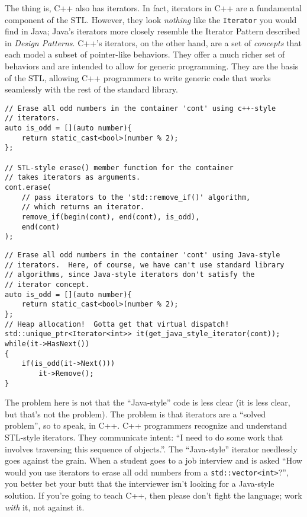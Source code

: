 \documentclass{article}
\begin{document}
The thing is, C++ also has iterators.  In fact, iterators in C++ are a fundamental component of the STL.  However, they look \emph{nothing} like the \lstinline{Iterator} you would find in Java; Java's iterators more closely resemble the Iterator Pattern described in \textit{Design Patterns}.  C++'s iterators, on the other hand, are a set of \emph{concepts} that each model a subset of pointer-like behaviors.  They offer a much richer set of behaviors and are intended to allow for generic programming.  They are the basis of the STL, allowing C++ programmers to write generic code that works seamlessly with the rest of the standard library.

\begin{lstlisting}
// Erase all odd numbers in the container 'cont' using c++-style 
// iterators.
auto is_odd = [](auto number){
	return static_cast<bool>(number % 2);
};

// STL-style erase() member function for the container 
// takes iterators as arguments.
cont.erase(
	// pass iterators to the 'std::remove_if()' algorithm, 
	// which returns an iterator.
	remove_if(begin(cont), end(cont), is_odd), 
	end(cont)
);
\end{lstlisting}

\begin{lstlisting}
// Erase all odd numbers in the container 'cont' using Java-style
// iterators.  Here, of course, we have can't use standard library
// algorithms, since Java-style iterators don't satisfy the 
// iterator concept.
auto is_odd = [](auto number){
	return static_cast<bool>(number % 2);
};
// Heap allocation!  Gotta get that virtual dispatch!
std::unique_ptr<Iterator<int>> it(get_java_style_iterator(cont));
while(it->HasNext())
{
	if(is_odd(it->Next()))
		it->Remove();
}
\end{lstlisting}

The problem here is not that the ``Java-style'' code is less clear (it is less clear, but that's not the problem).  The problem is that iterators are a ``solved problem'', so to speak, in C++.  C++ programmers recognize and understand STL-style iterators. They communicate intent: ``I need to do some work that involves traversing this sequence of objects.''.  The ``Java-style'' iterator needlessly goes against the grain.  When a student goes to a job interview and is asked ``How would you use iterators to erase all odd numbers from a \lstinline{std::vector<int>}?'', you better bet your butt that the interviewer isn't looking for a Java-style solution.  If you're going to teach C++, then please don't fight the language; work \emph{with} it, not against it.
\end{document}
